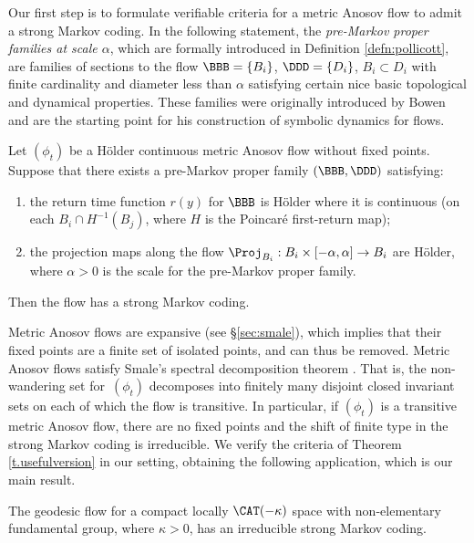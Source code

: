 Our first step is to formulate verifiable criteria for a metric Anosov flow to admit a strong Markov coding. In the following statement, the \emph{pre-Markov proper families at scale $\alpha$}, which are formally introduced in Definition \ref{defn:pollicott}, are families of sections to the flow $\BBB=\{B_i\}$, $\DDD=\{D_i\}$, $B_i \subset D_i$ with finite cardinality and diameter less than $\alpha$ satisfying certain nice basic topological and dynamical properties. These families were originally introduced by Bowen and are the starting point for his construction of symbolic dynamics for flows.
\begin{thmx} \label{t.usefulversion}
Let $(\phi_t)$ be a Hölder continuous metric Anosov flow without fixed points. Suppose that there exists a pre-Markov proper family $(\BBB, \DDD)$ satisfying:
\begin{enumerate}
\item\label{t.usefulversion1} the return time function $r(y)$ for $\BBB$ is Hölder where it is continuous (\ie on each $B_i \cap H^{-1}(B_j)$, where $H$ is the Poincaré first-return map);

\item\label{t.usefulversion2} the projection maps along the flow $\Proj_{B_{i}}: B_i \times [-\alpha, \alpha] \to B_i$ are Hölder, where $\alpha>0$ is the scale for the pre-Markov proper family.
\end{enumerate}
Then the flow has a strong Markov coding.
\end{thmx}
Metric Anosov flows are expansive (see \S \ref{sec:smale}), which implies that their fixed points are a finite set of isolated points, and can thus be removed. Metric Anosov flows satisfy Smale's spectral decomposition theorem \cite{pollicott}. That is, the non-wandering set for~$(\phi_t)$ decomposes into finitely many disjoint closed invariant sets on each of which the flow is transitive. In particular, if $(\phi_t)$ is a transitive metric Anosov flow, there are no fixed points and the shift of finite type in the strong Markov coding is irreducible. We verify the criteria of Theorem \ref{t.usefulversion} in our setting, obtaining the following application, which is our main result.

\begin{thmx} \label{t.main}
The geodesic flow for a compact locally $\CAT(-\kappa)$ space with non-elementary fundamental group, where $\kappa>0$, has an irreducible strong Markov coding.
\end{thmx}

